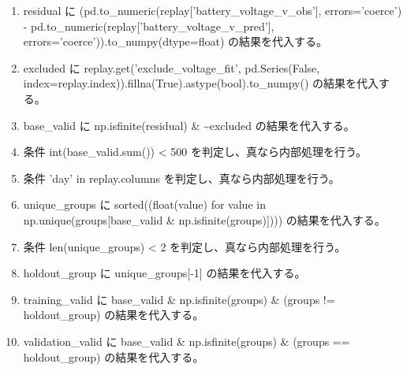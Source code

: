 \documentclass[a4paper,11pt]{article}
\begin{document}
            \begin{enumerate}[leftmargin=1.8em]
            \item residual に (pd.to\_numeric(replay['battery\_voltage\_v\_obs'], errors='coerce') - pd.to\_numeric(replay['battery\_voltage\_v\_pred'], errors='coerce')).to\_numpy(dtype=float) の結果を代入する。
\item excluded に replay.get('exclude\_voltage\_fit', pd.Series(False, index=replay.index)).fillna(True).astype(bool).to\_numpy() の結果を代入する。
\item base\_valid に np.isfinite(residual) \& \textasciitilde{}excluded の結果を代入する。
\item 条件 int(base\_valid.sum()) < 500 を判定し、真なら内部処理を行う。
\item 条件 'day' in replay.columns を判定し、真なら内部処理を行う。
\item unique\_groups に sorted((float(value) for value in np.unique(groups[base\_valid \& np.isfinite(groups)]))) の結果を代入する。
\item 条件 len(unique\_groups) < 2 を判定し、真なら内部処理を行う。
\item holdout\_group に unique\_groups[-1] の結果を代入する。
\item training\_valid に base\_valid \& np.isfinite(groups) \& (groups != holdout\_group) の結果を代入する。
\item validation\_valid に base\_valid \& np.isfinite(groups) \& (groups == holdout\_group) の結果を代入する。
            \end{enumerate}
\end{document}
